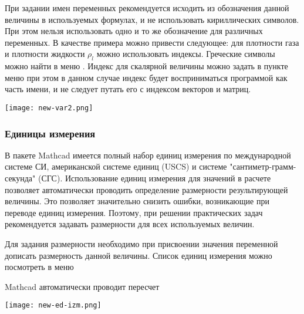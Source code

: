 При задании имен переменных рекомендуется исходить из обозначения данной величины в используемых формулах, и не использовать кириллических символов. При этом нельзя использовать одно и то же обозначение для различных переменных. В качестве примера можно привести следующее: для плотности газа  и плотности жидкости $\rho_l$ можно использовать индексы. Греческие символы можно найти в меню  . Индекс для скалярной величины можно задать в пункте меню  при этом в данном случае индекс будет восприниматься программой как часть имени, и не следует путать его с индексом векторов и матриц.
\begin{center}
	\texttt{[image: new-var2.png]}
\end{center}


\subsubsection*{Единицы измерения}
В пакете Mathcad имеется полный набор единиц измерения по международной системе СИ,  американской системе единиц  (USCS) и системе "сантиметр-грамм-секунда" (СГС). Использование единиц измерения для значений в расчете позволяет автоматически проводить определение размерности результирующей величины. Это позволяет значительно снизить ошибки, возникающие при переводе единиц измерения. Поэтому, при решении практических задач рекомендуется задавать размерности для всех используемых величин.

Для задания размерности необходимо при присвоении значения переменной дописать размерность данной величины. Список единиц измерения можно посмотреть в меню 

Mathcad автоматически проводит пересчет 
\begin{center}
	\texttt{[image: new-ed-izm.png]}
\end{center}

